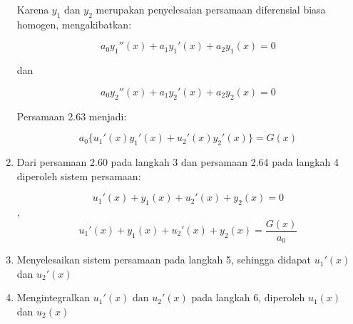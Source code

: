 \begin{enumerate}[1.]
	Karena \begin{math} y_1 \end{math} dan \begin{math} y_2 \end{math} merupakan penyelesaian persamaan diferensial biasa homogen, mengakibatkan:

	\begin{displaymath} a_0 y_1 '' (x) + a_1 y_1 ' (x) + a_2 y_1 (x) = 0 \end{displaymath}

	dan

	\begin{displaymath}  a_0 y_2 '' (x) + a_1 y_2 ' (x) + a_2 y_2 (x) = 0 \end{displaymath}

	Persamaan 2.63 menjadi:

	\begin{equation} a_0 \big\{ u_1 ' (x) y_1 ' (x) + u_2 ' (x) y_2 ' (x) \big\} = G(x) \end{equation}

	\item Dari persamaan 2.60 pada langkah 3 dan persamaan 2.64 pada langkah 4 diperoleh sistem persamaan:

	\begin{equation} u_1 ' (x) + y_1 (x) + u_2 ' (x) + y_2 (x) = 0 \end{equation} ,
	\begin{equation} u_1 ' (x) + y_1 (x) + u_2 ' (x) + y_2 (x) = \dfrac{G(x)}{a_0} \end{equation}

	\item Menyelesaikan sistem persamaan pada langkah 5, sehingga didapat \begin{math} u_1 ' (x) \end{math} dan \begin{math} u_2 ' (x) \end{math}

	\item Mengintegralkan \begin{math} u_1 ' (x) \end{math} dan \begin{math} u_2 ' (x) \end{math} pada langkah 6, diperoleh \begin{math} u_1 (x) \end{math} dan \begin{math} u_2 (x) \end{math}


\end{enumerate}

